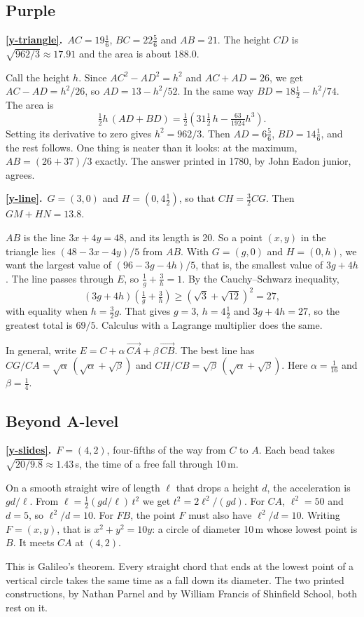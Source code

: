 \documentclass[11pt,a4paper]{article}
\newcommand{\ans}[2]{\par\smallskip\noindent\textbf{\ref{#1}.}\ #2}
\begin{document}
\subsection*{\color{bandpurple}Purple}

\ans{y-triangle}{$AC = 19\tfrac16$, $BC = 22\tfrac56$ and $AB = 21$. The height $CD$ is
$\sqrt{962/3} \approx 17.91$ and the area is about 188.0.

Call the height $h$. Since $AC^2 - AD^2 = h^2$ and $AC + AD = 26$, we get
$AC - AD = h^2/26$, so $AD = 13 - h^2/52$. In the same way $BD = 18\tfrac12 - h^2/74$.
The area is
\[
\tfrac12 h\,(AD + BD) = \tfrac12\left(31\tfrac12\,h - \tfrac{63}{1924}h^3\right).
\]
Setting its derivative to zero gives $h^2 = 962/3$. Then $AD = 6\tfrac56$, $BD = 14\tfrac16$,
and the rest follows. One thing is neater than it looks: at the maximum,
$AB = (26 + 37)/3$ exactly. The answer printed in 1780, by John Eadon junior, agrees.}

\ans{y-line}{$G = (3,0)$ and $H = (0,4\tfrac12)$, so that $CH = \tfrac32 CG$. Then
$GM + HN = 13.8$.

$AB$ is the line $3x + 4y = 48$, and its length is 20. So a point $(x,y)$ in the triangle
lies $(48 - 3x - 4y)/5$ from $AB$. With $G = (g,0)$ and $H = (0,h)$, we want the largest
value of $(96 - 3g - 4h)/5$, that is, the smallest value of $3g + 4h$. The line passes
through $E$, so $\tfrac1g + \tfrac3h = 1$. By the Cauchy--Schwarz inequality,
\[
(3g + 4h)\left(\tfrac1g + \tfrac3h\right) \ge \left(\sqrt3 + \sqrt{12}\right)^2 = 27,
\]
with equality when $h = \tfrac32 g$. That gives $g = 3$, $h = 4\tfrac12$ and $3g + 4h = 27$,
so the greatest total is $69/5$. Calculus with a Lagrange multiplier does the same.

In general, write $E = C + \alpha\,\overrightarrow{CA} + \beta\,\overrightarrow{CB}$. The best line
has $CG/CA = \sqrt\alpha\,(\sqrt\alpha + \sqrt\beta)$ and
$CH/CB = \sqrt\beta\,(\sqrt\alpha + \sqrt\beta)$. Here $\alpha = \tfrac1{16}$ and
$\beta = \tfrac14$.}

\subsection*{\color{bandgrey}Beyond A-level}

\ans{y-slides}{$F = (4,2)$, four-fifths of the way from $C$ to $A$. Each bead takes
$\sqrt{20/9.8} \approx 1.43$\,s, the time of a free fall through 10\,m.

On a smooth straight wire of length $\ell$ that drops a height $d$, the acceleration is
$gd/\ell$. From $\ell = \tfrac12(gd/\ell)\,t^2$ we get $t^2 = 2\ell^2/(gd)$. For $CA$,
$\ell^2 = 50$ and $d = 5$, so $\ell^2/d = 10$. For $FB$, the point $F$ must also have
$\ell^2/d = 10$. Writing $F = (x,y)$, that is $x^2 + y^2 = 10y$: a circle of diameter
10\,m whose lowest point is $B$. It meets $CA$ at $(4,2)$.

This is Galileo's theorem. Every straight chord that ends at the lowest point of a
vertical circle takes the same time as a fall down its diameter. The two printed
constructions, by Nathan Parnel and by William Francis of Shinfield School, both rest on
it.}
\end{document}
